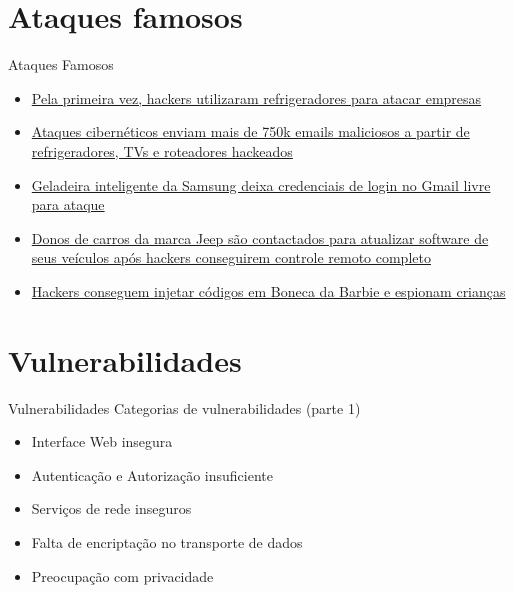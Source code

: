 \documentclass[t]{beamer}
\begin{document}
\section{Ataques famosos}

\begin{frame}{Ataques Famosos}
	\begin{itemize}
		\item \href{http://www.businessinsider.com/hackers-use-a-refridgerator-to-attack-businesses-2014-1}{Pela primeira vez, hackers utilizaram refrigeradores para atacar empresas}
		\item \href{http://www.theage.com.au/it-pro/security-it/cyber-attack-that-sent-750k-malicious-emails-traced-to-hacked-refrigerator-tvs-and-home-routers-20140120-hv96q.html}{Ataques cibernéticos enviam mais de 750k emails maliciosos a partir de refrigeradores, TVs e roteadores hackeados}
		\item \href{http://www.theregister.co.uk/2015/08/24/smart_fridge_security_fubar/}{Geladeira inteligente da Samsung deixa credenciais de login no Gmail livre para ataque}
		\item \href{http://www.theguardian.com/technology/2015/jul/21/jeep-owners-urged-update-car-software-hackers-remote-control}{Donos de carros da marca Jeep são contactados para atualizar software de seus veículos após hackers conseguirem controle remoto completo}
		\item \href{https://www.theguardian.com/technology/2015/nov/26/hackers-can-hijack-wi-fi-hello-barbie-to-spy-on-your-children}{Hackers conseguem injetar códigos em Boneca da Barbie e espionam crianças}
	\end{itemize}	
\end{frame}

\section{Vulnerabilidades}

\begin{frame}{Vulnerabilidades}
Categorias de vulnerabilidades (parte 1)
\begin{itemize}
	\item Interface Web insegura
	\item Autenticação e Autorização insuficiente
	\item Serviços de rede inseguros
	\item Falta de encriptação no transporte de dados
	\item Preocupação com privacidade
\end{itemize}
\end{frame}
\end{document}
